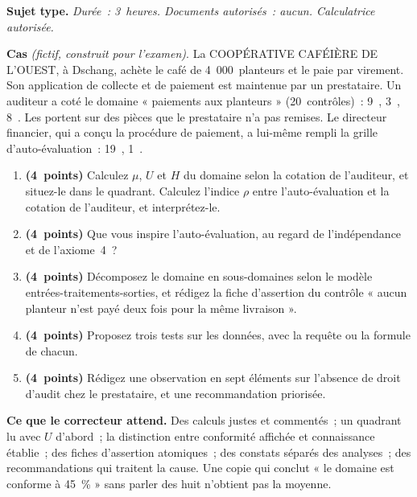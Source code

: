\begin{boxinfo}
\textbf{Sujet type.} \emph{Durée~: 3~heures. Documents autorisés~: aucun.
Calculatrice autorisée.}

\medskip
\textbf{Cas} \textit{(fictif, construit pour l'examen)}. La COOPÉRATIVE
CAFÉIÈRE DE L'OUEST, à Dschang, achète le café de 4~000~planteurs et le
paie par virement. Son application de collecte et de paiement est
maintenue par un prestataire. Un auditeur a coté le domaine « paiements
aux planteurs » (20~contrôles)~: 9~\OUI{}, 3~\NON{}, 8~\NEK{}. Les \NEK{}
portent sur des pièces que le prestataire n'a pas remises. Le directeur
financier, qui a conçu la procédure de paiement, a lui-même rempli la
grille d'auto-évaluation~: 19~\OUI{}, 1~\NON{}.

\medskip
\begin{enumerate}
    \item \textbf{(4~points)} Calculez $\mu$, $U$ et $H$ du domaine selon la
          cotation de l'auditeur, et situez-le dans le quadrant. Calculez
          l'indice $\rho$ entre l'auto-évaluation et la cotation de
          l'auditeur, et interprétez-le.
    \item \textbf{(4~points)} Que vous inspire l'auto-évaluation, au regard
          de l'indépendance et de l'axiome~4~?
    \item \textbf{(4~points)} Décomposez le domaine en sous-domaines selon le
          modèle entrées-traitements-sorties, et rédigez la fiche
          d'assertion du contrôle « aucun planteur n'est payé deux fois
          pour la même livraison ».
    \item \textbf{(4~points)} Proposez trois tests sur les données, avec la
          requête ou la formule de chacun.
    \item \textbf{(4~points)} Rédigez une observation en sept éléments sur
          l'absence de droit d'audit chez le prestataire, et une
          recommandation priorisée.
\end{enumerate}
\end{boxinfo}

\begin{boxalert}
\textbf{Ce que le correcteur attend.} Des calculs justes et commentés~; un
quadrant lu avec $U$ d'abord~; la distinction entre conformité affichée et
connaissance établie~; des fiches d'assertion atomiques~; des constats
séparés des analyses~; des recommandations qui traitent la cause. Une
copie qui conclut « le domaine est conforme à 45~\% » sans parler des huit
\NEK{} n'obtient pas la moyenne.
\end{boxalert}

